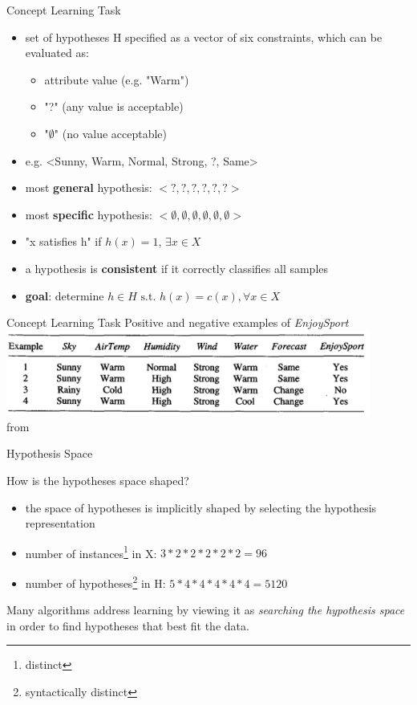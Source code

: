 \documentclass{beamer}
\begin{document}
\begin{frame}{Concept Learning Task}
\begin{itemize}
\item set of hypotheses H specified as a vector of six constraints, which can be evaluated as:
\begin{itemize}
\item attribute value (e.g. "Warm")
\item "?" (any value is acceptable)
\item "$\emptyset$" (no value acceptable)
\end{itemize}
\item e.g. <Sunny, Warm, Normal, Strong, ?, Same>
\item most \textbf{general} hypothesis: $<?,?,?,?,?,?>$
\item most \textbf{specific} hypothesis: $<\emptyset,\emptyset,\emptyset,\emptyset,\emptyset,\emptyset>$
\item "x satisfies h" if $h(x) = 1$, $\exists x \in X$
\item a hypothesis is \textbf{consistent} if it correctly classifies all samples 
\item \textbf{goal}: determine $h \in H \text{ s.t. } h(x) = c(x), \forall x \in X$
\end{itemize}
\end{frame}

\begin{frame}{Concept Learning Task}
Positive and negative examples of \emph{EnjoySport}
\centering
\includegraphics[width=0.9\textwidth]{enjoysport_examples}
\\from \cite{mitchell1997a}
\end{frame}

\begin{frame}{Hypothesis Space}
\begin{block}{How is the hypotheses space shaped?}
\begin{itemize}
\item the space of hypotheses is implicitly shaped by selecting the hypothesis representation
\item number of instances\footnote{distinct} in X: $3*2*2*2*2*2=96$ 
\item number of hypotheses\footnote{syntactically distinct} in H: $5*4*4*4*4*4=5120$
\end{itemize}
\end{block}
Many algorithms address learning by viewing it as \emph{searching the hypothesis space} in order to find hypotheses that best fit the data.
\end{frame}
\end{document}
